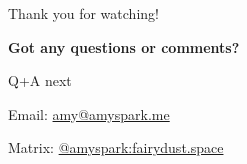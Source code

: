 \documentclass[aspectratio=169,handout,usepdftitle=false]{fireshonks}
\begin{document}
\begin{frame}{Thank you for watching!}
    \begin{center}
        {
            \large
            \textbf{Got any questions or comments?}
        }

        Q+A next

        Email: \href{mailto:amy@amyspark.me?subject="FireShonks 2023"}{amy@amyspark.me}

        Matrix: \href{https://matrix.to/\#/@amyspark:fairydust.space}{@amyspark:fairydust.space}
    \end{center}
\end{frame}
\begin{frame}{\bibname}
    \printbibliography[heading=none]
\end{frame}
\end{document}

